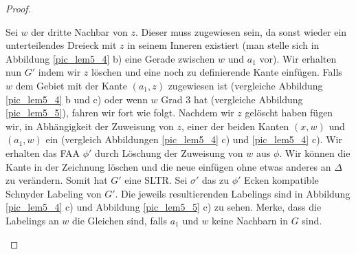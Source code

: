 \begin{proof}
\begin{description}[leftmargin =0pt, font = \bfseries]
Sei $w$ der dritte Nachbar von $z$. Dieser muss zugewiesen sein, da sonst wieder ein unterteilendes Dreieck mit $z$ in seinem Inneren existiert (man stelle sich in Abbildung \ref{pic_lem5_4} b) eine Gerade zwischen $w$ und $a_1$ vor). Wir erhalten nun $G'$ indem wir $z$ löschen und eine noch zu definierende Kante einfügen. Falls $w$ dem Gebiet mit der Kante $(a_1,z)$ zugewiesen ist (vergleiche Abbildung \ref{pic_lem5_4} b und c) oder wenn $w$ Grad 3 hat (vergleiche Abbildung \ref{pic_lem5_5}), fahren wir fort wie folgt. Nachdem wir $z$ gelöscht haben fügen wir, in Abhängigkeit der Zuweisung von $z$, einer der beiden Kanten $(x,w)$ und $(a_1,w)$ ein (vergleich Abbildungen \ref{pic_lem5_4} c) und \ref{pic_lem5_4} c). Wir erhalten das FAA $\phi'$ durch Löschung der Zuweisung von $w$ aus $\phi$. Wir können die Kante in der Zeichnung löschen und die neue einfügen ohne etwas anderes an $\Delta$ zu verändern. Somit hat $G'$ eine SLTR. Sei $\sigma'$ das zu $\phi'$ Ecken kompatible Schnyder Labeling von $G'$. Die jeweils resultierenden Labelings sind in Abbildung \ref{pic_lem5_4} c) und Abbildung \ref{pic_lem5_5} c) zu sehen. Merke, dass die Labelings an $w$ die Gleichen sind, falls $a_1$ und $w$ keine Nachbarn in $G$ sind. 


\end{description}
\end{proof}
